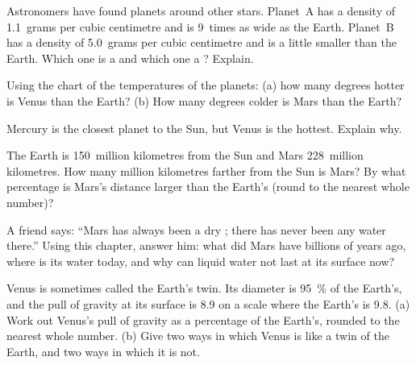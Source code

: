 \begin{exercise}[$\star\star$]\label{exo:g6:earth-a-planet:7}
Astronomers have found planets around other stars. Planet~A has a density
of 1.1~grams per cubic centimetre and is 9~times as wide as the Earth.
Planet~B has a density of 5.0~grams per cubic centimetre and is a little
smaller than the Earth. Which one is a  and which one a ? Explain.
\end{exercise}

\begin{exercise}[$\star\star$]\label{exo:g6:earth-a-planet:8}
Using the chart of the temperatures of the planets: (a) how many degrees
hotter is Venus than the Earth? (b) How many degrees colder is Mars than
the Earth?
\end{exercise}

\begin{exercise}[$\star\star$]\label{exo:g6:earth-a-planet:9}
Mercury is the closest planet to the Sun, but Venus is the hottest. Explain
why.
\end{exercise}

\begin{exercise}[$\star\star$]\label{exo:g6:earth-a-planet:10}
The Earth is 150~million kilometres from the Sun and Mars 228~million
kilometres. How many million kilometres farther from the Sun is Mars? By
what percentage is Mars's distance larger than the Earth's (round to the
nearest whole number)?
\end{exercise}

\begin{exercise}[$\star\star\star$]\label{exo:g6:earth-a-planet:11}
A friend says: ``Mars has always been a dry ; there has never been
any water there.'' Using this chapter, answer him: what did Mars have
billions of years ago, where is its water today, and why can liquid water
not last at its surface now?
\end{exercise}

\begin{exercise}[$\star\star\star$]\label{exo:g6:earth-a-planet:12}
Venus is sometimes called the Earth's twin. Its diameter is 95~\% of the
Earth's, and the pull of gravity at its surface is 8.9 on a scale where the
Earth's is 9.8. (a) Work out Venus's pull of gravity as a percentage of the
Earth's,
rounded to the nearest whole number. (b) Give two ways in which Venus is
like a twin of the Earth, and two ways in which it is not.
\end{exercise}

